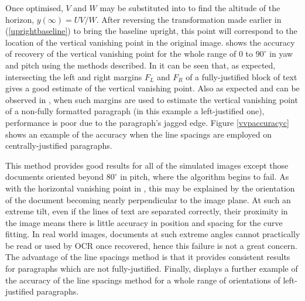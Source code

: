 Once optimised, $V$ and $W$ may be substituted into
 to find the altitude of the horizon, $y(\infty)=UV/W$.
% 
% 
After reversing the transformation made earlier in (\ref{uprightbaseline}) to
bring the baseline upright, this point will correspond to the location of the
vertical vanishing point in the original image.
 shows the accuracy of recovery of the vertical vanishing
point for the whole range of $0$ to $90^\circ$ in yaw and pitch using the
methods described.  In  it can be seen that, as expected,
intersecting the left and right margins $F_L$ and $F_R$ of a fully-justified block of text gives a
good estimate of the vertical vanishing point.  Also as expected and can be
observed in , when such margins are used to estimate the
vertical vanishing point of a non-fully formatted paragraph (in this example a
left-justified one), performance is poor due to the paragraph's jagged edge.
Figure \ref{vvpaccuracyc} shows an example of the accuracy when the line
spacings are employed on centrally-justified paragraphs.

This method provides good
results  for all of the simulated images except those
documents oriented beyond $80^\circ$ in pitch, where the algorithm begins to
fail. 
As with the horizontal vanishing point in , this may be
explained by the orientation of the document becoming nearly perpendicular to
the image plane. At such an extreme tilt, even if the lines of text are
separated correctly, their proximity in the image means there is little accuracy
in position and spacing for the curve fitting. In real world images, documents
at such extreme angles cannot practically be read or used by OCR once recovered,
hence this failure is not a great concern. The advantage of the line spacings
method is that it provides consistent results for paragraphs which are not 
fully-justified. Finally,  displays a further example of the
accuracy of the line spacings method for a whole range of orientations of
left-justified paragraphs.

